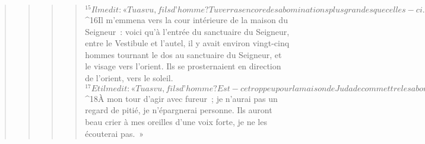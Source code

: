 \begin{verse}
\begin{verse}
\begin{verse}
\begin{verse}
${}^{15}Il me dit : « Tu as vu, fils d’homme ? Tu verras encore des abominations plus grandes que celles-ci. »
${}^{16}Il m’emmena vers la cour intérieure de la maison du Seigneur : voici qu’à l’entrée du sanctuaire du Seigneur, entre le Vestibule et l’autel, il y avait environ vingt-cinq hommes tournant le dos au sanctuaire du Seigneur, et le visage vers l’orient. Ils se prosternaient en direction de l’orient, vers le soleil. 
${}^{17}Et il me dit : « Tu as vu, fils d’homme ? Est-ce trop peu pour la maison de Juda de commettre les abominations qu’ils commettent ici ? Oui, ils remplissent le pays de violence, ils provoquent encore mon indignation : les voici qui élèvent le rameau jusqu’à leur nez ! 
${}^{18}À mon tour d’agir avec fureur ; je n’aurai pas un regard de pitié, je n’épargnerai personne. Ils auront beau crier à mes oreilles d’une voix forte, je ne les écouterai pas. »
      

\end{verse}
\end{verse}
\end{verse}
\end{verse}
